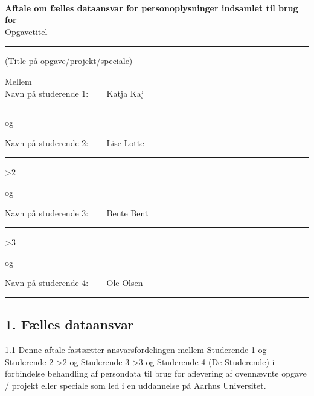 \documentclass[11pt, a4paper]{article}
\newcommand{\opgavetitel}{ Opgavetitel }	 		%
\newcommand{\studerendeET}{ Katja Kaj }	 		%
\newcommand{\studerendeTO}{ Lise Lotte }	 		%
\newcommand{\studerendeTRE}{ Bente Bent }	 		%
\newcommand{\studerendeFIRE}{ Ole Olsen }	 	%
\newcommand{\institution}{Aarhus Universitet} 		%
\newcounter{number_of_students}
\begin{document}
\pagestyle{fancy}
~
\vspace{1cm}

\textbf{Aftale om fælles dataansvar for personoplysninger indsamlet til brug for}~\\



\opgavetitel
\hrule
\vspace{2mm}
(Title på opgave/projekt/speciale)

\vspace{5mm}


Mellem\\ 

Navn på studerende 1: ~~~\studerendeET
\vspace{1mm}
\hrule

\vspace{5mm}

og 
\vspace{5mm}

Navn på studerende 2: ~~~\studerendeTO
\vspace{1mm}
\hrule

\vspace{5mm}

\ifnum \value{number_of_students}>2 {
og 
\vspace{5mm}

Navn på studerende 3: ~~~\studerendeTRE
\vspace{1mm}
\hrule

\vspace{5mm}
} \fi

\ifnum \value{number_of_students}>3 {
og 
\vspace{5mm}

Navn på studerende 4: ~~~\studerendeFIRE
\vspace{1mm}
\hrule

\vspace{5mm}
} \fi


\newpage
\subsection*{1. Fælles dataansvar}

1.1 Denne aftale fastsætter ansvarsfordelingen mellem Studerende 1 og Studerende 2 \ifnum \value{number_of_students}>2 {og Studerende 3 }\fi \ifnum \value{number_of_students}>3 { og Studerende 4 }\fi (De Studerende) i forbindelse behandling af persondata til brug for aflevering af ovennævnte opgave / projekt eller speciale som led i en uddannelse på \institution.\\
\end{document}
